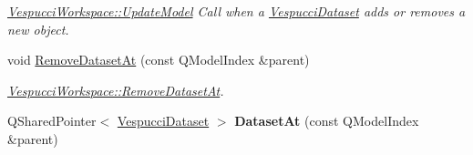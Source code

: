 \begin{DoxyCompactItemize}
\begin{DoxyCompactList}\small\item\em \hyperlink{class_vespucci_workspace_a892e53b99bb8cd45b2384c8aa9c0b79f}{Vespucci\+Workspace\+::\+Update\+Model} Call when a \hyperlink{class_vespucci_dataset}{Vespucci\+Dataset} adds or removes a new object. \end{DoxyCompactList}\item 
void \hyperlink{class_vespucci_workspace_a9be4b9f81b24f6ff531bc946c0ff338c}{Remove\+Dataset\+At} (const Q\+Model\+Index \&parent)
\begin{DoxyCompactList}\small\item\em \hyperlink{class_vespucci_workspace_a9be4b9f81b24f6ff531bc946c0ff338c}{Vespucci\+Workspace\+::\+Remove\+Dataset\+At}. \end{DoxyCompactList}\item 
Q\+Shared\+Pointer$<$ \hyperlink{class_vespucci_dataset}{Vespucci\+Dataset} $>$ {\bfseries Dataset\+At} (const Q\+Model\+Index \&parent)\hypertarget{class_vespucci_workspace_a2245f1ae30a735be2d8aff3b13bfaa85}{}\label{class_vespucci_workspace_a2245f1ae30a735be2d8aff3b13bfaa85}


\end{DoxyCompactItemize}
